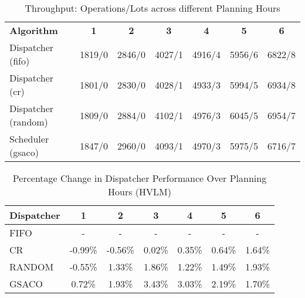 \begin{table}[t]
	\caption{Throughput: Operations/Lots across different Planning Hours} \label{tab:my_label} \centering
	\begin{tabular}{|l|c|c|c|c|c|c|}
		\hline
		\textbf{Algorithm} & \textbf{1} & \textbf{2} & \textbf{3} & \textbf{4} & \textbf{5} & \textbf{6} \\ \cline{1-7} 
		Dispatcher (fifo)   & 1819/0 & 2846/0 & 4027/1 & 4916/4 & 5956/6 & 6822/8 \\
		Dispatcher (cr)     & 1801/0 & 2830/0 & 4028/1 & 4933/3 & 5994/5 & 6934/8 \\
		Dispatcher (random) & 1809/0 & 2884/0 & 4102/1 & 4976/3 & 6045/5 & 6954/7 \\
		Scheduler (gsaco)   & 1847/0 & 2960/0 & 4093/1 & 4970/3 & 5975/5 & 6716/7 \\
		\hline 
	\end{tabular}
\end{table}


\begin{table}[t]
	\caption{Percentage Change in Dispatcher Performance Over Planning Hours (HVLM)} \label{tab:dispatchers} \centering
	\begin{tabular}{|l|c|c|c|c|c|c|}
		\hline
		\textbf{Dispatcher} & \textbf{1} & \textbf{2} & \textbf{3} & \textbf{4} & \textbf{5} & \textbf{6} \\
		\hline 
		FIFO     & -    & -    & -    & -    & -    & -    \\
		CR       & -0.99\% & -0.56\% & 0.02\% & 0.35\% & 0.64\% & 1.64\% \\
		RANDOM   & -0.55\% & 1.33\% & 1.86\% & 1.22\% & 1.49\% & 1.93\% \\
		GSACO    & 0.72\% & 1.93\% & 3.43\% & 3.03\% & 2.19\% & 1.70\% \\
		\hline
	\end{tabular}
\end{table}